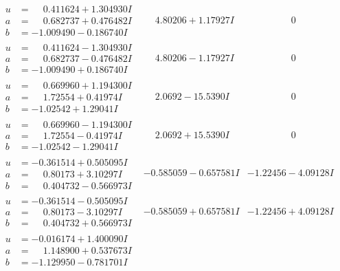 \documentclass[1p]{elsarticle_modified}
\theoremstyle{definition}
\begin{document}
$$\begin{array}{c|c|c}
\begin{aligned}
u &= \phantom{-}0.411624 + 1.304930 I \\
a &= \phantom{-}0.682737 + 0.476482 I \\
b &= -1.009490 - 0.186740 I\end{aligned}
 & \phantom{-}4.80206 + 1.17927 I & \phantom{-0.000000 } 0 \\ \hline\begin{aligned}
u &= \phantom{-}0.411624 - 1.304930 I \\
a &= \phantom{-}0.682737 - 0.476482 I \\
b &= -1.009490 + 0.186740 I\end{aligned}
 & \phantom{-}4.80206 - 1.17927 I & \phantom{-0.000000 } 0 \\ \hline\begin{aligned}
u &= \phantom{-}0.669960 + 1.194300 I \\
a &= \phantom{-}1.72554 + 0.41974 I \\
b &= -1.02542 + 1.29041 I\end{aligned}
 & \phantom{-}2.0692 - 15.5390 I & \phantom{-0.000000 } 0 \\ \hline\begin{aligned}
u &= \phantom{-}0.669960 - 1.194300 I \\
a &= \phantom{-}1.72554 - 0.41974 I \\
b &= -1.02542 - 1.29041 I\end{aligned}
 & \phantom{-}2.0692 + 15.5390 I & \phantom{-0.000000 } 0 \\ \hline\begin{aligned}
u &= -0.361514 + 0.505095 I \\
a &= \phantom{-}0.80173 + 3.10297 I \\
b &= \phantom{-}0.404732 - 0.566973 I\end{aligned}
 & -0.585059 - 0.657581 I & -1.22456 - 4.09128 I \\ \hline\begin{aligned}
u &= -0.361514 - 0.505095 I \\
a &= \phantom{-}0.80173 - 3.10297 I \\
b &= \phantom{-}0.404732 + 0.566973 I\end{aligned}
 & -0.585059 + 0.657581 I & -1.22456 + 4.09128 I \\ \hline\begin{aligned}
u &= -0.016174 + 1.400090 I \\
a &= \phantom{-}1.148900 + 0.537673 I \\
b &= -1.129950 - 0.781701 I\end{aligned}

\end{array}$$
\end{document}
